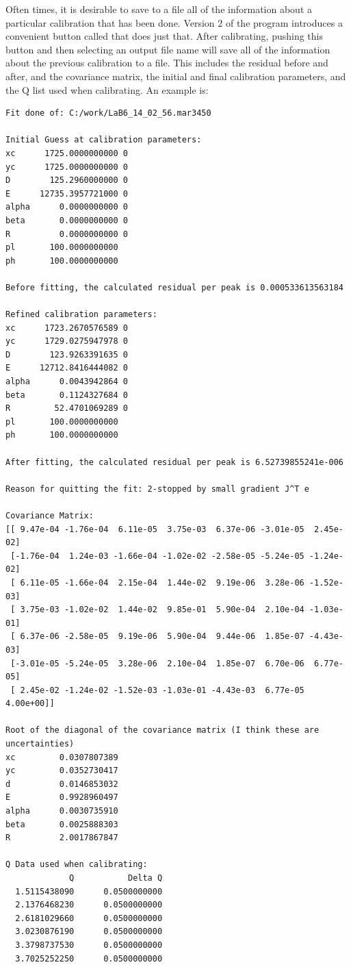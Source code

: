 Often times, it is desirable to save to a file 
all of the information about a particular calibration
that has been done. Version 2 of the program introduces
a convenient button called  that
does just that. After calibrating, pushing this button
and then selecting an output file name will save all of the
information about the previous calibration to a file.
This includes the residual before and after, and the 
covariance matrix, the initial and final calibration
parameters, and the Q list used when calibrating. 
An example is:
\begin{lstlisting}[basicstyle=\ttfamily\footnotesize]
Fit done of: C:/work/LaB6_14_02_56.mar3450

Initial Guess at calibration parameters:
xc      1725.0000000000 0
yc      1725.0000000000 0
D        125.2960000000 0
E      12735.3957721000 0
alpha      0.0000000000 0
beta       0.0000000000 0
R          0.0000000000 0
pl       100.0000000000
ph       100.0000000000

Before fitting, the calculated residual per peak is 0.000533613563184

Refined calibration parameters:
xc      1723.2670576589 0
yc      1729.0275947978 0
D        123.9263391635 0
E      12712.8416444082 0
alpha      0.0043942864 0
beta       0.1124327684 0
R         52.4701069289 0
pl       100.0000000000
ph       100.0000000000

After fitting, the calculated residual per peak is 6.52739855241e-006

Reason for quitting the fit: 2-stopped by small gradient J^T e

Covariance Matrix:
[[ 9.47e-04 -1.76e-04  6.11e-05  3.75e-03  6.37e-06 -3.01e-05  2.45e-02]
 [-1.76e-04  1.24e-03 -1.66e-04 -1.02e-02 -2.58e-05 -5.24e-05 -1.24e-02]
 [ 6.11e-05 -1.66e-04  2.15e-04  1.44e-02  9.19e-06  3.28e-06 -1.52e-03]
 [ 3.75e-03 -1.02e-02  1.44e-02  9.85e-01  5.90e-04  2.10e-04 -1.03e-01]
 [ 6.37e-06 -2.58e-05  9.19e-06  5.90e-04  9.44e-06  1.85e-07 -4.43e-03]
 [-3.01e-05 -5.24e-05  3.28e-06  2.10e-04  1.85e-07  6.70e-06  6.77e-05]
 [ 2.45e-02 -1.24e-02 -1.52e-03 -1.03e-01 -4.43e-03  6.77e-05  4.00e+00]]

Root of the diagonal of the covariance matrix (I think these are uncertainties)
xc         0.0307807389
yc         0.0352730417
d          0.0146853032
E          0.9928960497
alpha      0.0030735910
beta       0.0025888303
R          2.0017867847

Q Data used when calibrating:
             Q           Delta Q
  1.5115438090      0.0500000000
  2.1376468230      0.0500000000
  2.6181029660      0.0500000000
  3.0230876190      0.0500000000
  3.3798737530      0.0500000000
  3.7025252250      0.0500000000
\end{lstlisting}

